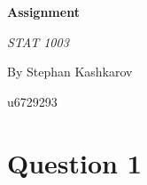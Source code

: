 \documentclass[a4paper, 12pt]{article}
\begin{document}
    \begin{titlepage}
        \begin{center}

        \Large\textbf{Assignment}
         
        \large\textit{STAT 1003}

        \vspace{4cm}
        By Stephan Kashkarov

        u6729293
      \end{center}
    \end{titlepage}
    \tableofcontents
    \newpage

    \section{Question 1}
\end{document}
